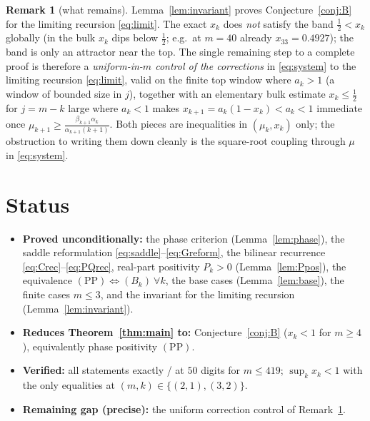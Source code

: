 \documentclass[11pt]{article}
\theoremstyle{definition}
\newtheorem{remark}{Remark}
\begin{document}
\begin{remark}[what remains]\label{rem:gap}
Lemma~\ref{lem:invariant} proves Conjecture~\ref{conj:B} for the limiting
recursion \eqref{eq:limit}.  The exact $x_k$ does \emph{not} satisfy the band
$\tfrac12<x_k$ globally (in the bulk $x_k$ dips below $\tfrac12$; e.g.\ at $m=40$
already $x_{33}=0.4927$); the band is only an attractor near the top.  The single
remaining step to a complete proof is therefore a \emph{uniform-in-$m$ control of
the corrections} in \eqref{eq:system} to the limiting recursion
\eqref{eq:limit}, valid on the finite top window where $a_k>1$ (a window of
bounded size in $j$), together with an elementary bulk estimate $x_k\le\tfrac12$
for $j=m-k$ large where $a_k<1$ makes $x_{k+1}=a_k(1-x_k)<a_k<1$ immediate once
$\mu_{k+1}\ge\frac{\beta_{k+1}\alpha_k}{\alpha_{k+1}(k+1)}$.  Both pieces are
inequalities in $(\mu_k,x_k)$ only; the obstruction to writing them down cleanly
is the square-root coupling through $\mu$ in \eqref{eq:system}.
\end{remark}

\section{Status}
\begin{itemize}
\item \textbf{Proved unconditionally:} the phase criterion (Lemma~\ref{lem:phase}),
the saddle reformulation \eqref{eq:saddle}--\eqref{eq:Greform}, the bilinear
recurrence \eqref{eq:Crec}--\eqref{eq:PQrec}, real-part positivity $P_k>0$
(Lemma~\ref{lem:Ppos}), the equivalence $(\mathrm{PP})\Leftrightarrow(B_k)\
\forall k$, the base cases (Lemma~\ref{lem:base}), the finite cases $m\le3$, and
the invariant for the limiting recursion (Lemma~\ref{lem:invariant}).
\item \textbf{Reduces Theorem~\ref{thm:main} to:} Conjecture~\ref{conj:B}
($x_k<1$ for $m\ge4$), equivalently phase positivity $(\mathrm{PP})$.
\item \textbf{Verified:} all statements exactly / at $50$ digits for $m\le419$;
$\sup_k x_k<1$ with the only equalities at $(m,k)\in\{(2,1),(3,2)\}$.
\item \textbf{Remaining gap (precise):} the uniform correction control of
Remark~\ref{rem:gap}.
\end{itemize}
\end{document}
